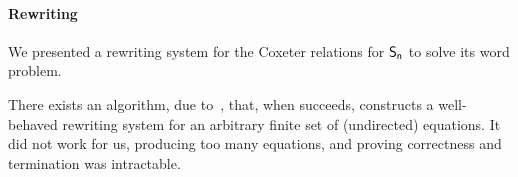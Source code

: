 
\paragraph{Rewriting} We presented a rewriting system for the Coxeter relations for $\Sn$ to solve its word problem.

There exists an algorithm, due to~\citet{knuthSimpleWordProblems1970}, that, when succeeds, constructs a well-behaved
rewriting system for an arbitrary finite set of (undirected) equations. It did not work for us, producing too many
equations, and proving correctness and termination was intractable.

